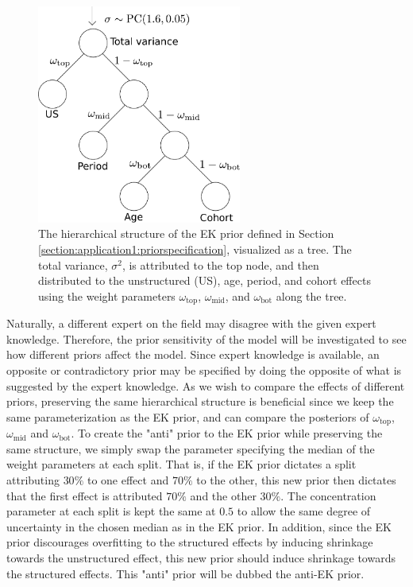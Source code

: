 \begin{figure}[h!]
    \centering
    \includegraphics[width=0.6\textwidth]{Figures/Tree_some_annot.pdf}
    \caption{The hierarchical structure of the EK prior defined in Section \ref{section:application1:priorspecification}, visualized as a tree. The total variance, $\sigma^2$, is attributed to the top node, and then distributed to the unstructured (US), age, period, and cohort effects using the weight parameters $\omega_{\text{top}}$, $\omega_{\text{mid}}$, and $\omega_{\text{bot}}$ along the tree.}
    \label{figure:EK-tree}
\end{figure}

Naturally, a different expert on the field may disagree with the given expert knowledge. Therefore, the prior sensitivity of the model will be investigated to see how different priors affect the model. Since expert knowledge is available, an opposite or contradictory prior may be specified by doing the opposite of what is suggested by the expert knowledge. As we wish to compare the effects of different priors, preserving the same hierarchical structure is beneficial since we keep the same parameterization as the EK prior, and can compare the posteriors of $\omega_{\text{top}}$, $\omega_{\text{mid}}$ and $\omega_{\text{bot}}$. To create the "anti" prior to the EK prior while preserving the same structure, we simply swap the parameter specifying the median of the weight parameters at each split. That is, if the EK prior dictates a split attributing $30\%$ to one effect and $70\%$ to the other, this new prior then dictates that the first effect is attributed $70\%$ and the other $30\%$. The concentration parameter at each split is kept the same at $0.5$ to allow the same degree of uncertainty in the chosen median as in the EK prior. In addition, since the EK prior discourages overfitting to the structured effects by inducing shrinkage towards the unstructured effect, this new prior should induce shrinkage towards the structured effects. This "anti" prior will be dubbed the anti-EK prior.

